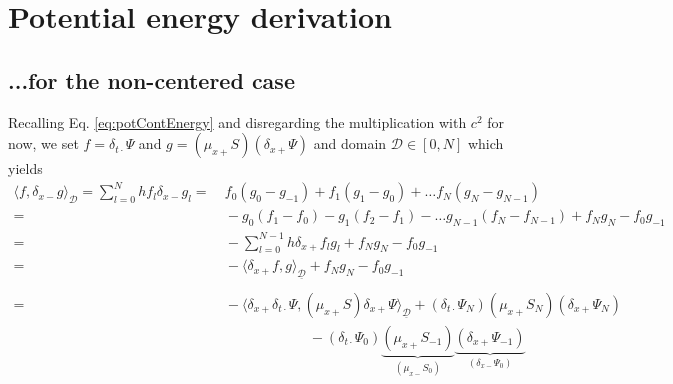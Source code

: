 \documentclass[dvipsnames]{article}
\def\dxp{\delta_{x+}}
\def\dxm{\delta_{x-}}
\def\mup{\mu_{x+}}
\def\mum{\mu_{x-}}
\def\dtd{\delta_{t\cdot}}
\begin{document}
\section{Potential energy derivation}\label{app:potDeriv}
\subsection{...for the non-centered case}\label{app:potDerivNonCent}
Recalling Eq. \eqref{eq:potContEnergy} and disregarding the multiplication with $c^2$ for now, we set $f=\dtd\Psi$ and $g = (\mup S)(\dxp \Psi)$ and domain $\mathcal{D} \in [0,N]$ which yields
\begin{align}
    \langle f, \dxm g\rangle_\mathcal{D} = \sum_{l=0}^N hf_l\dxm g_l =&\  f_0(g_0-g_{-1}) + f_1(g_1-g_0) + \hdots f_N(g_N-g_{N-1}) \nonumber\\
    =&\ - g_0(f_1-f_0) - g_1(f_2-f_1) - \hdots g_{N-1}(f_N-f_{N-1})  + f_Ng_N - f_0g_{-1}\nonumber\\
    =&\  -\sum_{l=0}^{N-1}h\dxp f_lg_l + f_Ng_N - f_0g_{-1}\nonumber\\
    =&\  -\langle\dxp f,  g\rangle_\mathcal{\underline{D}} + f_Ng_N - f_0g_{-1}\nonumber\\
    &\nonumber \\
    = &\ -\langle\dxp\dtd\Psi,(\mup S) \dxp\Psi\rangle_{\underline{\mathcal{D}}} + (\dtd\Psi_N)(\mup S_N)(\dxp\Psi_N) \nonumber\\
    &\ \qquad\qquad\qquad- (\dtd\Psi_0)\underbrace{(\mup S_{-1})}_{(\mum S_0)}\underbrace{(\dxp\Psi_{-1})}_{(\dxm \Psi_0)}
\end{align} 
\end{document}
